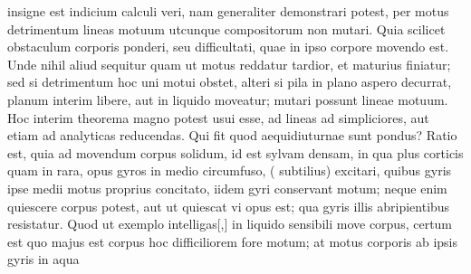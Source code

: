 insigne est indicium calculi veri, nam generaliter demonstrari potest,
per motus detrimentum lineas motuum utcunque compositorum non mutari.
Quia scilicet obstaculum
corporis ponderi\protect{}, seu difficultati, quae in ipso corpore movendo est.
Unde nihil aliud sequitur quam ut motus reddatur tardior, et maturius finiatur;
sed si detrimentum hoc uni motui obstet, alteri  
si pila\protect{} in plano aspero decurrat,
planum interim libere, aut in liquido moveatur; mutari possunt lineae motuum.
Hoc interim theorema magno potest usui esse, ad lineas 
ad simpliciores, aut etiam ad analyticas reducendas.
\pend
\count{}
\count{}
\count{}
\pstart
Qui fit quod aequidiuturnae sunt
 pondus?
Ratio est, quia ad movendum corpus solidum, id est sylvam densam, in qua plus corticis quam in rara,
opus 
gyros 
in medio circumfuso, ( subtilius)
excitari, quibus gyris ipse medii motus proprius
concitato, iidem gyri conservant motum;
neque enim quiescere corpus potest, aut ut quiescat vi opus est;
qua gyris illis abripientibus resistatur.
Quod ut exemplo intelligas[,] in liquido sensibili move corpus, certum est quo majus est corpus hoc difficiliorem fore motum;
at motus corporis ab ipsis gyris in aqua\protect{}
